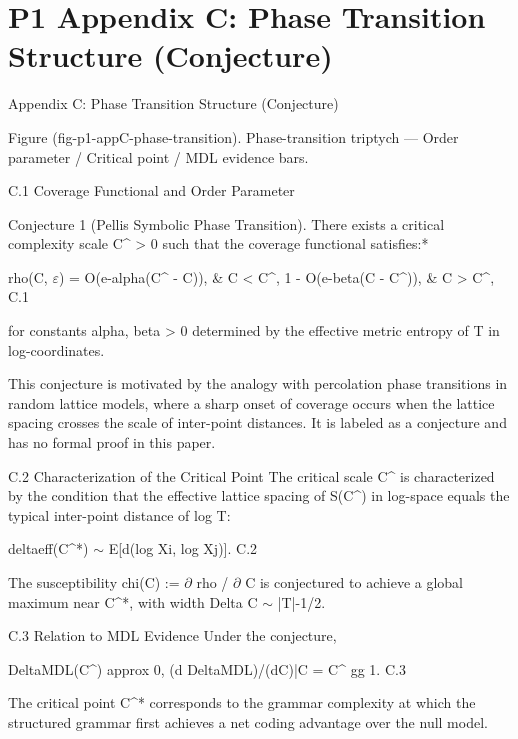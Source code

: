 
\section{P1 Appendix C: Phase Transition Structure (Conjecture)}

Appendix C: Phase Transition Structure (Conjecture)

       Figure (fig-p1-appC-phase-transition). Phase-transition triptych --- Order parameter / Critical
                                       point / MDL evidence bars.

  C.1 Coverage Functional and Order Parameter

        Conjecture 1 (Pellis Symbolic Phase Transition). There exists a critical
        complexity scale C^ > 0 such that the coverage functional satisfies:*

  rho(C, $\varepsilon$) = O(e-alpha(C^ - C)), \& C < C^, 1 - O(e-beta(C - C^)), \& C > C^, C.1

  for constants alpha, beta > 0 determined by the effective metric entropy of T in
  log-coordinates.

  This conjecture is motivated by the analogy with percolation phase transitions in
  random lattice models, where a sharp onset of coverage occurs when the lattice
  spacing crosses the scale of inter-point distances. It is labeled as a conjecture and has
  no formal proof in this paper.

  C.2 Characterization of the Critical Point
  The critical scale C^ is characterized by the condition that the effective lattice spacing
  of S(C^) in log-space equals the typical inter-point distance of log T:

  deltaeff(C^*) $\sim$ E[d(log Xi, log Xj)]. C.2

  The susceptibility chi(C) := $\partial$ rho / $\partial$ C is conjectured to achieve a global maximum near
  C^*, with width Delta C $\sim$ |T|-1/2.

  C.3 Relation to MDL Evidence
  Under the conjecture,

  DeltaMDL(C^) approx 0, (d DeltaMDL)/(dC)|C = C^ gg 1. C.3

  The critical point C^* corresponds to the grammar complexity at which the structured
  grammar first achieves a net coding advantage over the null model.

